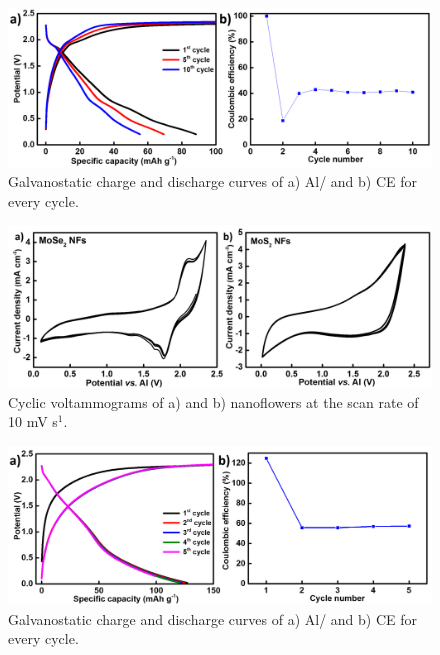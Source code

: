 \begin{figure}[h!]
  \centering
  \includegraphics[width=\textwidth]{Figures/chap6fig/mose2yncdcce}
    \caption{Galvanostatic charge and discharge curves of a) Al/ and b) CE for every cycle.}
  \label{Figures/chap6fig:mose2yncdcce}
\end{figure}

\begin{figure}[th!]
\centering
\includegraphics[width=\textwidth]{Figures/chap6fig/mox2yncv}
\caption{Cyclic voltammograms of a) and b) nanoflowers at the scan rate of 10 mV s$^{1}$.}
\label{Figures/chap6fig:mox2yncv}
\end{figure}

\begin{figure}[h!]
  \centering
  \includegraphics[width=\textwidth]{Figures/chap6fig/mos2yncdcce}
    \caption{Galvanostatic charge and discharge curves of a) Al/ and b) CE for every cycle.}
  \label{Figures/chap6fig:mos2yncdcce}
\end{figure}

